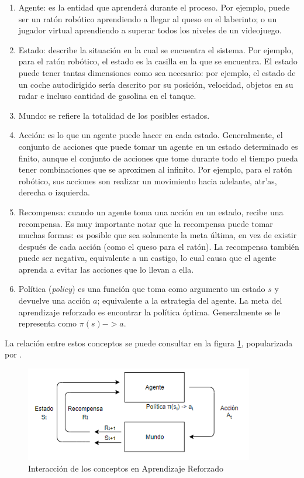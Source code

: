 \begin{enumerate}
    \item Agente: es la entidad que aprender\'a durante el proceso. Por ejemplo, puede ser un rat\'on rob\'otico aprendiendo a llegar al queso en el laberinto; o un jugador virtual aprendiendo a superar todos los niveles de un videojuego.
    \item Estado: describe la situaci\'on en la cual se encuentra el sistema. Por ejemplo, para el rat\'on rob\'otico, el estado es la casilla en la que se encuentra. El estado puede tener tantas dimensiones como sea necesario: por ejemplo, el estado de un coche autodirigido ser\'ia descrito por su posici\'on, velocidad, objetos en su radar e incluso cantidad de gasolina en el tanque.
    \item Mundo: se refiere la totalidad de los posibles estados.
    \item Acci\'on: es lo que un agente puede hacer en cada estado. Generalmente, el conjunto de acciones que puede tomar un agente en un estado determinado es finito, aunque el conjunto de acciones que tome durante todo el tiempo pueda tener combinaciones que se aproximen al infinito. Por ejemplo, para el rat\'on rob\'otico, sus acciones son realizar un movimiento hacia adelante, atr'as, derecha o izquierda.
    \item Recompensa: cuando un agente toma una acci\'on en un estado, recibe una recompensa. Es muy importante notar que la recompensa puede tomar muchas formas: es posible que sea solamente la meta \'ultima, en vez de existir despu\'es de cada acci\'on (como el queso para el rat\'on). La recompensa tambi\'en puede ser negativa, equivalente a un castigo, lo cual causa que el agente aprenda a evitar las acciones que lo llevan a ella.
    \item Pol\'itica (\textit{policy}) es una funci\'on que toma como argumento un estado $s$ y devuelve una acci\'on $a$; equivalente a la estrategia del agente. La meta del aprendizaje reforzado es encontrar la pol\'itica \'optima. Generalmente se le representa como $\pi(s)->a$.
\end{enumerate}

La relaci\'on entre estos conceptos se puede consultar en la figura \ref{rl_concepts}, popularizada por \citet{Sutton}.\\

\begin{figure}[ht]
\caption{Interacci\'on de los conceptos en Aprendizaje Reforzado}
\label{rl_concepts}
\includegraphics[width=10cm]{tesis_tex/figs/rl_concepts.PNG}
\centering
\end{figure}

